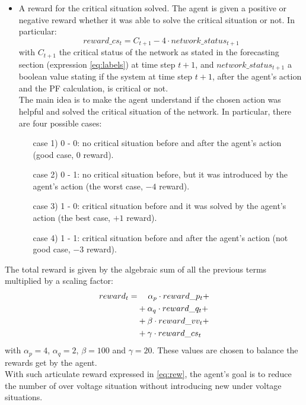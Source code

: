 \begin{itemize}
\begin{itemize}
        \item A reward for the critical situation solved. The agent is given a positive or negative reward whether it was able to solve the critical situation or not. In particular:\\
        \[
            reward\_cs_t =  C_{t+1} - 4 \cdot network\_status_{t+1}
        \]
        with $C_{t+1}$ the critical status of the network as stated in the forecasting section (expression \ref{eq:labels}) at time step $t+1$, and $network\_status_{t+1}$ a boolean value stating if the system at time step $t+1$, after the agent's action and the \gls{PF} calculation, is critical or not.\\
        The main idea is to make the agent understand if the chosen action was helpful and solved the critical situation of the network. In particular, there are four possible cases:\\
        
        \begin{itemize}[leftmargin=2cm]\label{im:cases}
            \item[case 1)] 0 - 0: no critical situation before and after the agent's action (good case, $0$ reward).
            \item[case 2)] 0 - 1: no critical situation before, but it was introduced by the agent's action (the worst case, $-4$ reward).
            \item[case 3)] 1 - 0: critical situation before and it was solved by the agent's action (the best case, $+1$ reward).
            \item[case 4)] 1 - 1: critical situation before and after the agent's action (not good case, $-3$ reward).
        \end{itemize}
        
        
        
    \end{itemize}
    The total reward is given by the algebraic sum of all the previous terms multiplied by a scaling factor:
    \begin{equation} \label{eq:rew}
      \begin{aligned}
            reward_t = &\hphantom{..,,} 
                          \alpha_p \cdot reward\_p_t + \\
                       &+ \alpha_q \cdot reward\_q_t + \\
                       &+ \beta \cdot reward\_vv_t + \\
                       &+ \gamma \cdot reward\_cs_t
      \end{aligned}
    \end{equation}
    with $\alpha_p=4$, $\alpha_q=2$, $\beta=100$ and $\gamma=20$. These values are chosen to balance the rewards get by the agent.\\
    With such articulate reward expressed in \ref{eq:rew}, the agent's goal is to reduce the number of over voltage situation without introducing new under voltage situations.
    

\end{itemize}

